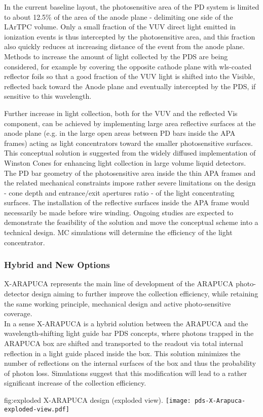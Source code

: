 In the current baseline layout, the photosensitive area of the PD system is limited to about 12.5\% of the area of the anode plane - delimiting one side of the LArTPC volume. 
Only a small fraction of the VUV direct light emitted in ionization events is thus intercepted by the photosensitive area, and this fraction also quickly reduces at increasing distance of the event from the anode plane. \\
Methods to increase the amount of light collected by the PDS are being considered, for example by covering the opposite cathode plane with wls-coated reflector foils so that a good fraction of the VUV light is shifted into the Visible, reflected back toward the Anode plane and eventually intercepted by the PDS, if sensitive to this wavelength.

Further increase in light collection, both for the VUV and the reflected Vis component, can be achieved by implementing large area reflective surfaces at the anode plane (e.g. in the large open areas between PD bars inside the APA frames) acting as light concentrators toward the smaller photosensitive surfaces.  
This conceptual solution is suggested from the widely diffused implementation of Winston Cones for enhancing light collection in large volume liquid detectors. 
The PD bar geometry of the photosensitive area inside the thin APA frames and the related mechanical constraints impose rather severe limitations on the design - cone depth and entrance$/$exit apertures ratio - of the light concentrating surfaces. The installation of the reflective surfaces inside the APA frame would necessarily be made before wire winding. 
Ongoing studies are expected to demonstrate the feasibility of the solution and move the conceptual scheme into a technical design. MC simulations will determine the efficiency of the light concentrator. 




\subsubsection{Hybrid and New Options}

X-ARAPUCA represents the main line of development of the ARAPUCA photo-detector design aiming to further improve the collection efficiency, while retaining the same working
 principle, mechanical design and active  photo-sensitive coverage.\\
In a sense X-ARAPUCA is a hybrid solution between the ARAPUCA and the wavelength-shifting light guide bar PDS concepts, 
where photons trapped in the ARAPUCA box are shifted and transported to the readout via total internal reflection in a light guide placed inside the box.
This solution minimizes the number of reflections on the internal surfaces of the box and thus the probability of photon loss. Simulations suggest that
 this modification will lead to a rather significant increase of the collection efficiency.
 \begin{dunefigure}{fig:exploded}
{X-ARAPUCA design (exploded view).}
   \texttt{[image: pds-X-Arapuca-exploded-view.pdf]}
\end{dunefigure}

